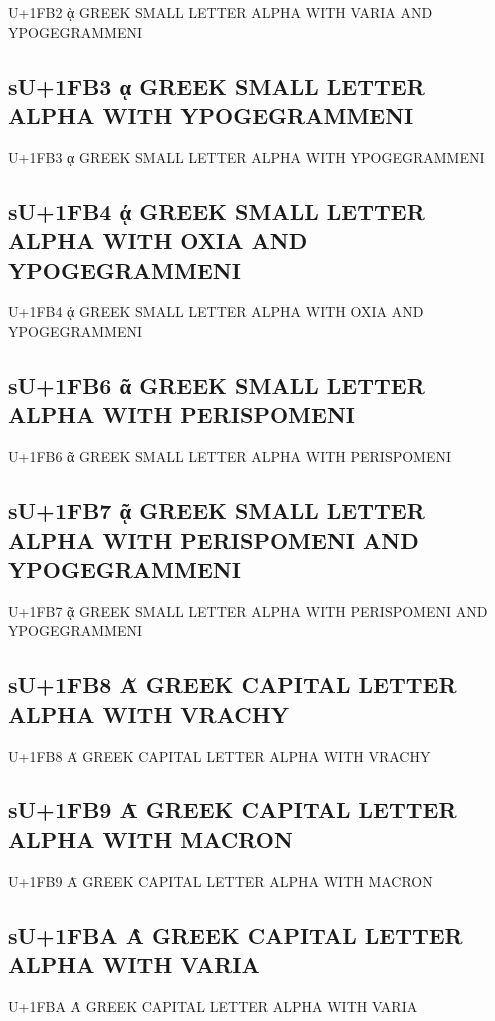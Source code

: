 U+1FB2 ᾲ GREEK SMALL LETTER ALPHA WITH VARIA AND YPOGEGRAMMENI

\subsection{sU+1FB3 ᾳ GREEK SMALL LETTER ALPHA WITH YPOGEGRAMMENI}

U+1FB3 ᾳ GREEK SMALL LETTER ALPHA WITH YPOGEGRAMMENI

\subsection{sU+1FB4 ᾴ GREEK SMALL LETTER ALPHA WITH OXIA AND YPOGEGRAMMENI}

U+1FB4 ᾴ GREEK SMALL LETTER ALPHA WITH OXIA AND YPOGEGRAMMENI

\subsection{sU+1FB6 ᾶ GREEK SMALL LETTER ALPHA WITH PERISPOMENI}

U+1FB6 ᾶ GREEK SMALL LETTER ALPHA WITH PERISPOMENI

\subsection{sU+1FB7 ᾷ GREEK SMALL LETTER ALPHA WITH PERISPOMENI AND YPOGEGRAMMENI}

U+1FB7 ᾷ GREEK SMALL LETTER ALPHA WITH PERISPOMENI AND YPOGEGRAMMENI

\subsection{sU+1FB8 Ᾰ GREEK CAPITAL LETTER ALPHA WITH VRACHY}

U+1FB8 Ᾰ GREEK CAPITAL LETTER ALPHA WITH VRACHY

\subsection{sU+1FB9 Ᾱ GREEK CAPITAL LETTER ALPHA WITH MACRON}

U+1FB9 Ᾱ GREEK CAPITAL LETTER ALPHA WITH MACRON

\subsection{sU+1FBA Ὰ GREEK CAPITAL LETTER ALPHA WITH VARIA}

U+1FBA Ὰ GREEK CAPITAL LETTER ALPHA WITH VARIA

